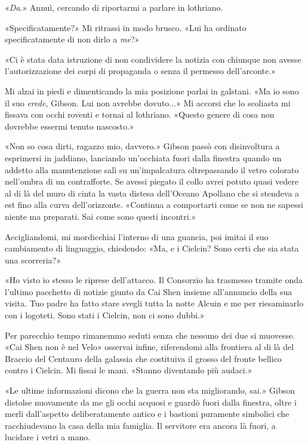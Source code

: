«\emph{Da}.» Annuì, cercando di riportarmi a parlare in lothriano.

«Specificatamente?» Mi ritrassi in modo brusco. «Lui ha ordinato
specificatamente di non dirlo a \emph{me}?»

«Ci è stata data istruzione di non condividere la notizia con chiunque
non avesse l'autorizzazione dei corpi di propaganda o senza il permesso
dell'arconte.»

Mi alzai in piedi e dimenticando la mia posizione parlai in galstani.
«Ma io sono il suo \emph{erede}, Gibson. Lui non avrebbe dovuto...» Mi
accorsi che lo scoliasta mi fissava con occhi roventi e tornai al
lothriano. «Questo genere di cosa non dovrebbe essermi tenuto nascosto.»

«Non so cosa dirti, ragazzo mio, davvero.» Gibson passò con disinvoltura
a esprimersi in jaddiano, lanciando un'occhiata fuori dalla finestra
quando un addetto alla manutenzione salì su un'impalcatura oltrepassando
il vetro colorato nell'ombra di un contrafforte. Se avessi piegato il
collo avrei potuto quasi vedere al di là del muro di cinta la vasta
distesa dell'Oceano Apollano che si {stendeva} a est fino alla curva
dell'orizzonte. «Continua a comportarti come se non ne sapessi niente ma
preparati. Sai come sono questi incontri.»

Accigliandomi, mi mordicchiai l'interno di una guancia, poi imitai il
suo cambiamento di linguaggio, chiedendo: «Ma, e i Cielcin? Sono certi
che sia stata una scorreria?»

«Ho visto io stesso le riprese dell'attacco. Il Consorzio ha trasmesso
tramite onda l'ultimo pacchetto di notizie giunto da Cai Shen insieme
all'annuncio della sua visita. Tuo padre ha fatto stare svegli tutta la
notte Alcuin e me per riesaminarlo con i logoteti. Sono stati i Cielcin,
non ci sono dubbi.»

Per parecchio tempo rimanemmo seduti senza che nessuno dei due si
muovesse. «Cai Shen non è nel Velo» osservai infine, riferendomi alla
frontiera al di là del Braccio del Centauro della galassia che
costituiva il grosso del fronte bellico contro i Cielcin. Mi fissai le
mani. «Stanno diventando più audaci.»

«Le ultime informazioni dicono che la guerra non sta migliorando, sai.»
Gibson distolse nuovamente da me gli occhi acquosi e guardò fuori dalla
finestra, oltre i merli dall'aspetto deliberatamente antico e i bastioni
puramente simbolici che racchiudevano la casa della mia famiglia. Il
servitore era ancora là fuori, a lucidare i vetri a mano.

